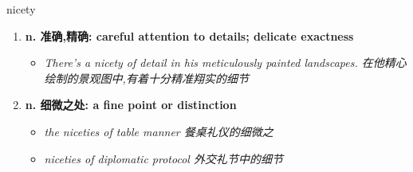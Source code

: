 
\begin{frame}
{\huge nicety}
\begin{center}
\begin{enumerate}\Large
  \item \textbf{n. 准确,精确: careful attention to details; delicate exactness}
  \begin{itemize}
    \item \em{\Large{There's a nicety of detail in his meticulously painted landscapes. 在他精心绘制的景观图中,有着十分精准翔实的细节}}
  \end{itemize}
  \item \textbf{n. 细微之处: a fine point or distinction}
  \begin{itemize}
    \item \em{\Large{the niceties of table manner 餐桌礼仪的细微之}}
    \item \em{\Large{niceties of diplomatic protocol 外交礼节中的细节}}
  \end{itemize}
\end{enumerate}
\end{center}
\end{frame}
